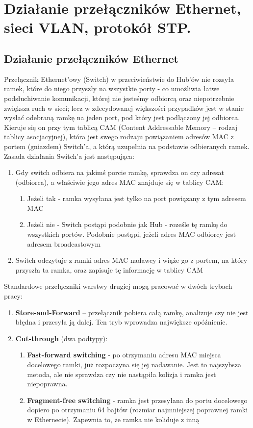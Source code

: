 \documentclass[12pt]{article}
\begin{document}
    \section{Działanie przełączników Ethernet, sieci VLAN, protokół STP.}
    \subsection{Działanie przełączników Ethernet}
    Przełącznik Ethernet'owy (Switch) w przeciwieństwie do Hub'ów nie rozsyła ramek, które do niego przyszły na wszystkie porty - co umożliwia łatwe podsłuchiwanie komunikacji,
    której nie jesteśmy odbiorcą oraz niepotrzebnie zwiększa ruch w sieci; lecz w zdecydowanej większości przypadków jest w stanie wysłać odebraną ramkę na jeden port,
    pod który jest podłączony jej odbiorca. Kieruje się on przy tym tablicą CAM (Content Addressable Memory – rodzaj tablicy asocjacyjnej), która jest swego rodzaju powiązaniem
    adresów MAC z portem (gniazdem) Switch'a, a którą uzupełnia na podstawie odbieranych ramek.
    Zasada działania Switch'a jest następująca:
    \begin{enumerate}
        \item Gdy switch odbiera na jakimś porcie ramkę, sprawdza on czy adresat (odbiorca), a właściwie jego adres MAC znajduje się w tablicy CAM:
        \begin{enumerate}
            \item Jeżeli tak - ramka wysyłana jest tylko na port powiązany z tym adresem MAC
            \item Jeżeli nie - Switch postąpi podobnie jak Hub - roześle tę ramkę do wszystkich portów. Podobnie postąpi, jeżeli adres MAC odbiorcy jest adresem broadcastowym
        \end{enumerate}
        \item Switch odczytuje z ramki adres MAC nadawcy i wiąże go z portem, na który przyszła ta ramka, oraz zapisuje tę informację w tablicy CAM
    \end{enumerate}

    \noindent Standardowe przełączniki warstwy drugiej mogą pracować w dwóch trybach pracy:
    \begin{enumerate}
        \item \textbf{Store-and-Forward} – przełącznik pobiera całą ramkę, analizuje czy nie jest błędna i przesyła ją dalej. Ten tryb wprowadza największe opóźnienie.
        \item \textbf{Cut-through} (dwa podtypy):
        \begin{enumerate}
            \item \textbf{Fast-forward switching} - po otrzymaniu adresu MAC miejsca docelowego ramki, już rozpoczyna się jej nadawanie.
            Jest to najszybsza metoda, ale nie sprawdza czy nie nastąpiła kolizja i ramka jest niepoprawna.
            \item \textbf{Fragment-free switching} - ramka jest przesyłana do portu docelowego dopiero po otrzymaniu 64 bajtów (rozmiar najmniejszej poprawnej ramki w Ethernecie).
            Zapewnia to, że ramka nie koliduje z inną
        \end{enumerate}
    \end{enumerate}
\end{document}
